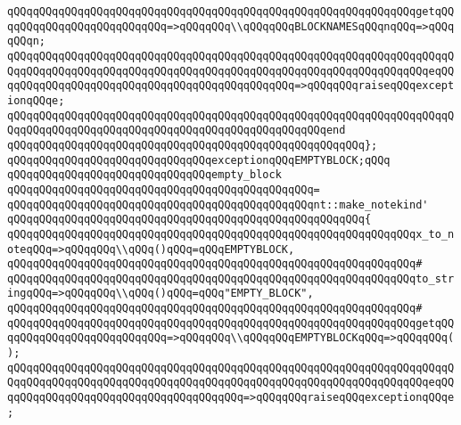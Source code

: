 \verb|qQQqqQQqqQQqqQQqqQQqqQQqqQQqqQQqqQQqqQQqqQQqqQQqqQQqqQQqqQQqqQQqgetqQQqqQQqqQQqqQQqqQQqqQQqqQQq=>qQQqqQQq\\qQQqqQQqBLOCKNAMESqQQqnqQQq=>qQQqqQQqn;|\newline
\verb|qQQqqQQqqQQqqQQqqQQqqQQqqQQqqQQqqQQqqQQqqQQqqQQqqQQqqQQqqQQqqQQqqQQqqQQqqQQqqQQqqQQqqQQqqQQqqQQqqQQqqQQqqQQqqQQqqQQqqQQqqQQqqQQqqQQqqQQqeqQQqqQQqqQQqqQQqqQQqqQQqqQQqqQQqqQQqqQQqqQQqqQQq=>qQQqqQQqraiseqQQqexceptionqQQqe;|\newline
\verb|qQQqqQQqqQQqqQQqqQQqqQQqqQQqqQQqqQQqqQQqqQQqqQQqqQQqqQQqqQQqqQQqqQQqqQQqqQQqqQQqqQQqqQQqqQQqqQQqqQQqqQQqqQQqqQQqqQQqqQQqend|\newline
\verb|qQQqqQQqqQQqqQQqqQQqqQQqqQQqqQQqqQQqqQQqqQQqqQQqqQQqqQQq};|\newline
\newline
\verb|qQQqqQQqqQQqqQQqqQQqqQQqqQQqqQQqexceptionqQQqEMPTYBLOCK;qQQq|\newline
\newline
\verb|qQQqqQQqqQQqqQQqqQQqqQQqqQQqqQQqempty_block|\newline
\verb|qQQqqQQqqQQqqQQqqQQqqQQqqQQqqQQqqQQqqQQqqQQqqQQq=|\newline
\verb|qQQqqQQqqQQqqQQqqQQqqQQqqQQqqQQqqQQqqQQqqQQqqQQqnt::make_notekind'|\newline
\verb|qQQqqQQqqQQqqQQqqQQqqQQqqQQqqQQqqQQqqQQqqQQqqQQqqQQqqQQq{|\newline
\verb|qQQqqQQqqQQqqQQqqQQqqQQqqQQqqQQqqQQqqQQqqQQqqQQqqQQqqQQqqQQqqQQqx_to_noteqQQq=>qQQqqQQq\\qQQq()qQQq=qQQqEMPTYBLOCK,|\newline
\verb|qQQqqQQqqQQqqQQqqQQqqQQqqQQqqQQqqQQqqQQqqQQqqQQqqQQqqQQqqQQqqQQq#|\newline
\verb|qQQqqQQqqQQqqQQqqQQqqQQqqQQqqQQqqQQqqQQqqQQqqQQqqQQqqQQqqQQqqQQqto_stringqQQq=>qQQqqQQq\\qQQq()qQQq=qQQq"EMPTY_BLOCK",|\newline
\verb|qQQqqQQqqQQqqQQqqQQqqQQqqQQqqQQqqQQqqQQqqQQqqQQqqQQqqQQqqQQqqQQq#|\newline
\verb|qQQqqQQqqQQqqQQqqQQqqQQqqQQqqQQqqQQqqQQqqQQqqQQqqQQqqQQqqQQqqQQqgetqQQqqQQqqQQqqQQqqQQqqQQqqQQq=>qQQqqQQq\\qQQqqQQqEMPTYBLOCKqQQq=>qQQqqQQq();|\newline
\verb|qQQqqQQqqQQqqQQqqQQqqQQqqQQqqQQqqQQqqQQqqQQqqQQqqQQqqQQqqQQqqQQqqQQqqQQqqQQqqQQqqQQqqQQqqQQqqQQqqQQqqQQqqQQqqQQqqQQqqQQqqQQqqQQqqQQqqQQqeqQQqqQQqqQQqqQQqqQQqqQQqqQQqqQQqqQQqqQQq=>qQQqqQQqraiseqQQqexceptionqQQqe;|\newline
